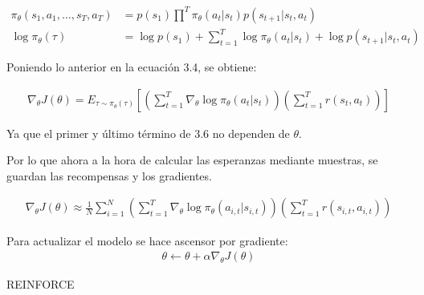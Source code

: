 \begin{align}
    \pi _ { \theta } ( s _ { 1 } , a _ { 1 } , \ldots , s _ { T } , a _ { T } ) &= p ( s _ { 1 } )
\prod ^ { T } \pi _ { \theta } ( a _ { t } | s _ { t } ) p ( s _ { t + 1 } | s _ { t } , a _ { t
} )\\
\operatorname { log } \pi _ { \theta } ( \tau ) &= \operatorname { log } p ( s _ { 1 } ) + \sum _ { t = 1 } ^ { T } \operatorname { log } \pi _ { \theta } ( a _ { t } | s _ { t } ) + \operatorname { log } p ( s _ { t + 1 } | s _ { t } , a _ { t } )
\end{align}

Poniendo lo anterior en la ecuación 3.4, se obtiene:

\begin{align}
\nabla _ { \theta } J ( \theta ) = E _ { \tau \sim \pi _ { \theta } ( \tau ) } \left[ ( \sum _ {
    t = 1 } ^ { T } \nabla _ { \theta } \operatorname { log } \pi _ { \theta } ( a _ { t } | s _
    { t } ) ) ( \sum _ { t = 1 } ^ { T } r ( s _ { t } , a _ { t } ) ) \right]
\end{align}

Ya que el primer y último término de 3.6 no dependen de $\theta$.

Por lo que ahora a la hora de calcular las esperanzas mediante muestras, se guardan las
recompensas y los gradientes. 

\begin{align}
\nabla _ { \theta } J ( \theta ) \approx \frac { 1 } { N } \sum _ { i = 1 } ^ { N } ( \sum _ { t = 1 } ^ { T } \nabla _ { \theta } \operatorname { log } \pi _ { \theta } ( a _ { i , t } | s _ { i , t } ) ) ( \sum _ { t = 1 } ^ { T } r ( s _ { i , t } , a _ { i , t } ) )
\end{align}

Para actualizar el modelo se hace ascensor por gradiente:
\begin{align}
    \theta \gets \theta + \alpha\nabla_\theta J(\theta)
\end{align}

\begin{algorithm}
    \caption{REINFORCE}
\end{algorithm}

